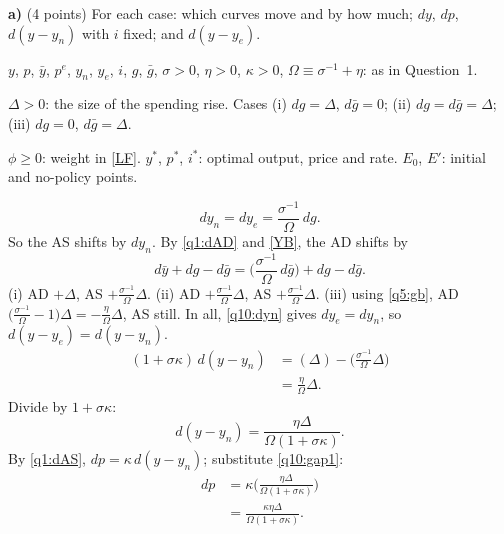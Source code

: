 \textbf{a)} (4 points) For each case: which curves move and by how much; $dy$, $dp$, $d(y-y_n)$ with $i$ fixed; and $d(y-y_e)$.
\resolespaco
\begin{sol}
\begin{notacao}
\item $y$, $p$, $\bar y$, $p^e$, $y_n$, $y_e$, $i$, $g$, $\bar g$, $\sigma>0$, $\eta>0$, $\kappa>0$, $\Omega\equiv\sigma^{-1}+\eta$: as in Question~1.
\item $\Delta>0$: the size of the spending rise. Cases (i) $dg=\Delta$, $d\bar g=0$; (ii) $dg=d\bar g=\Delta$; (iii) $dg=0$, $d\bar g=\Delta$.
\item $\phi\ge0$: weight in \eqref{LF}. $y^*$, $p^*$, $i^*$: optimal output, price and rate. $E_0$, $E'$: initial and no-policy points.
\end{notacao}
\begin{equation}
dy_n=dy_e=\frac{\sigma^{-1}}{\Omega}\,dg . \label{q10:dyn}
\end{equation}
So the AS shifts by $dy_n$. By \eqref{q1:dAD} and \eqref{YB}, the AD shifts by
\begin{equation}
d\bar y+dg-d\bar g=\Big(\frac{\sigma^{-1}}{\Omega}\,d\bar g\Big)+dg-d\bar g . \label{q10:ad}
\end{equation}
(i) AD $+\Delta$, AS $+\frac{\sigma^{-1}}{\Omega}\Delta$. (ii) AD $+\frac{\sigma^{-1}}{\Omega}\Delta$, AS $+\frac{\sigma^{-1}}{\Omega}\Delta$. (iii) using \eqref{q5:gb}, AD
$\big(\frac{\sigma^{-1}}{\Omega}-1\big)\Delta=-\frac{\eta}{\Omega}\Delta$, AS still. In all, \eqref{q10:dyn} gives $dy_e=dy_n$, so $d(y-y_e)=d(y-y_n)$.
\begin{align*}
(1+\sigma\kappa)\,d(y-y_n)&=(\Delta)-\Big(\frac{\sigma^{-1}}{\Omega}\Delta\Big)\\
&=\frac{\eta}{\Omega}\Delta .
\end{align*}
Divide by $1+\sigma\kappa$:
\begin{equation}
d(y-y_n)=\frac{\eta\Delta}{\Omega(1+\sigma\kappa)} . \label{q10:gap1}
\end{equation}
By \eqref{q1:dAS}, $dp=\kappa\,d(y-y_n)$; substitute \eqref{q10:gap1}:
\begin{align}
dp&=\kappa\Big(\frac{\eta\Delta}{\Omega(1+\sigma\kappa)}\Big)\nonumber\\
&=\frac{\kappa\eta\Delta}{\Omega(1+\sigma\kappa)} . \nonumber
\end{align}

\end{sol}
